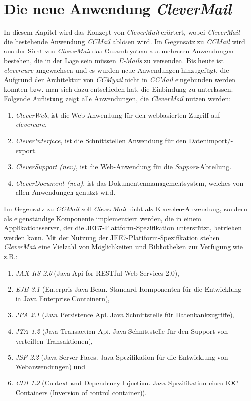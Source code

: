 \chapter{Die neue Anwendung \emph{CleverMail}}
\label{cha:clevermail}
In diesem Kapitel wird das Konzept von \emph{CleverMail} erörtert, wobei \emph{CleverMail} die bestehende Anwendung \emph{CCMail} ablösen wird. Im Gegensatz zu \emph{CCMail} wird aus der Sicht von \emph{CleverMail} das Gesamtsystem aus mehreren Anwendungen bestehen, die in der Lage sein müssen \emph{E-Mails} zu versenden. Bis heute ist \emph{clevercure} angewachsen und es wurden neue Anwendungen hinzugefügt, die Aufgrund der Architektur von \emph{CCMyail} nicht in \emph{CCMail} eingebunden werden konnten bzw. man sich dazu entschieden hat, die Einbindung zu unterlassen.
\newline
\newline
Folgende Auflistung zeigt alle Anwendungen, die \emph{CleverMail} nutzen werden:
\begin{enumerate}
	\item\emph{CleverWeb}, ist die Web-Anwendung für den webbasierten Zugriff auf \emph{clevercure}.
	\item\emph{CleverInterface}, ist die Schnittstellen Anwendung für den Datenimport/-export.
	\item\emph{CleverSupport (neu)}, ist die Web-Anwendung für die \emph{Support}-Abteilung.
	\item\emph{CleverDocument (neu)}, ist das Dokumentenmanagementsystem, welches von allen Anwendungen genutzt wird.
\end{enumerate}
Im Gegensatz zu \emph{CCMail} soll \emph{CleverMail} nicht als Konsolen-Anwendung, sondern als eigenständige Komponente implementiert werden, die in einem Applikationsserver, der die JEE7-Plattform-Spezifikation unterstützt, betrieben werden kann.
\newpage
Mit der Nutzung der JEE7-Plattform-Spezifikation stehen \emph{CleverMail} eine Vielzahl von Möglichkeiten und Bibliotheken zur Verfügung wie z.B.: 
\begin{enumerate}
	\item\emph{JAX-RS 2.0} (Java Api for RESTful Web Services 2.0),
	\item\emph{EJB 3.1} (Enterpris Java Bean. Standard Komponenten für die Entwicklung in Java Enterprise Containern), 
	\item\emph{JPA 2.1} (Java Persistence Api. Java Schnittstelle für Datenbankzugriffe), 
	\item\emph{JTA 1.2} (Java Transaction Api. Java Schnittstelle für den Support von verteilten Transaktionen), 
	\item\emph{JSF 2.2} (Java Server Faces. Java Spezifikation für die Entwicklung von Webanwendungen) und 
	\item\emph{CDI 1.2} (Context and Dependency Injection. Java Spezifikation eines IOC-Containers (Inversion of control container)).
\end{enumerate}
